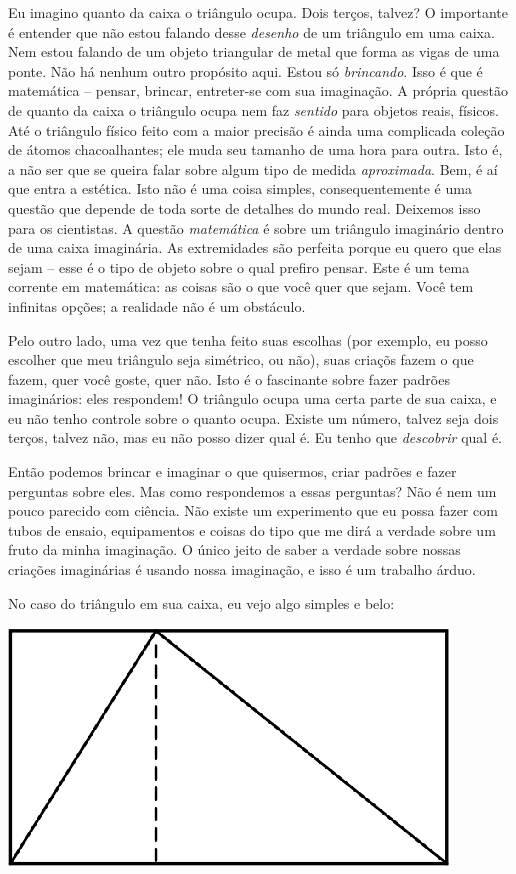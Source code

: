 \documentclass[a4paper,oneside,12pt,notitlepage]{article}
\begin{document}
Eu imagino quanto da caixa o triângulo ocupa.
Dois terços, talvez?
O importante é entender que não estou falando desse \textsl{desenho} de um triângulo em uma caixa.
Nem estou falando de um objeto triangular de metal que forma as vigas de uma ponte. %
Não há nenhum outro propósito aqui.
Estou só \textsl{brincando}.
Isso é que é matemática -- pensar, brincar, entreter-se com sua imaginação.
A própria questão de quanto da caixa o triângulo ocupa nem faz \textsl{sentido} para objetos reais, físicos.
Até o triângulo físico feito com a maior precisão é ainda uma complicada coleção de átomos chacoalhantes; ele muda seu tamanho de uma hora para outra.
Isto é, a não ser que se queira falar sobre algum tipo de medida \textsl{aproximada}.
Bem, é aí que entra a estética.
Isto não é uma coisa simples, consequentemente é uma questão que depende de toda sorte de detalhes do mundo real.
Deixemos isso para os cientistas.
A questão \textsl{matemática} é sobre um triângulo imaginário dentro de uma caixa imaginária.
As extremidades são perfeita porque eu quero que elas sejam -- esse é o tipo de objeto sobre o qual prefiro pensar.
Este é um tema corrente em matemática: as coisas são o que você quer que sejam.
Você tem infinitas opções; a realidade não é um obstáculo.

Pelo outro lado, uma vez que tenha feito suas escolhas (por exemplo, eu posso escolher que meu triângulo seja simétrico, ou não), suas criaçõs fazem o que fazem, quer você goste, quer não.
Isto é o fascinante sobre fazer padrões imaginários: eles respondem!
O triângulo ocupa uma certa parte de sua caixa, e eu não tenho controle sobre o quanto ocupa.
Existe um número, talvez seja dois terços, talvez não, mas eu não posso dizer qual é.
Eu tenho que \textsl{descobrir} qual é.

Então podemos brincar e imaginar o que quisermos, criar padrões e fazer perguntas sobre eles.
Mas como respondemos a essas perguntas?
Não é nem um pouco parecido com ciência.
Não existe um experimento que eu possa fazer com tubos de ensaio, equipamentos e coisas do tipo que me dirá a verdade sobre um fruto da minha imaginação.
O único jeito de saber a verdade sobre nossas criações imaginárias é usando nossa imaginação, e isso é um trabalho árduo.

No caso do triângulo em sua caixa, eu vejo algo simples e belo:

\begin{center}
\includegraphics{triangle1.eps}
\end{center}
\end{document}
